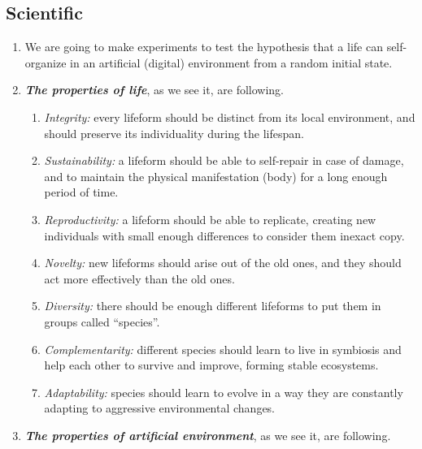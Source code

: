 \documentclass[a4paper,12pt,tikz,UTF8]{article}
\begin{document}
  \subsection{Scientific}
  \label{subsec:manifest-scientific}
  \begin{enumerate}

    \item We are going to make experiments to test the hypothesis that a life can self-organize in an artificial (digital) environment from a random initial state.

    \item \textbf{\textit{The properties of life}}, as we see it, are following.
      \begin{enumerate}
        \item \textit{Integrity:} every lifeform should be distinct from its local environment, and should preserve its individuality during the lifespan.
        \item \textit{Sustainability:} a lifeform should be able to self-repair in case of damage, and to maintain the physical manifestation (body) for a long enough period of time.
        \item \textit{Reproductivity:} a lifeform should be able to replicate, creating new individuals with small enough differences to consider them inexact copy.
        \item \textit{Novelty:} new lifeforms should arise out of the old ones, and they should act more effectively than the old ones. 
        \item \textit{Diversity:} there should be enough different lifeforms to put them in groups called ``species''.
        \item \textit{Complementarity:} different species should learn to live in symbiosis and help each other to survive and improve, forming stable ecosystems.
        \item \textit{Adaptability:} species should learn to evolve in a way they are constantly adapting to aggressive environmental changes.
      \end{enumerate}

    \item \textbf{\textit{The properties of artificial environment}}, as we see it, are following.
      \begin{enumerate}


\end{enumerate}
\end{enumerate}
\end{document}
